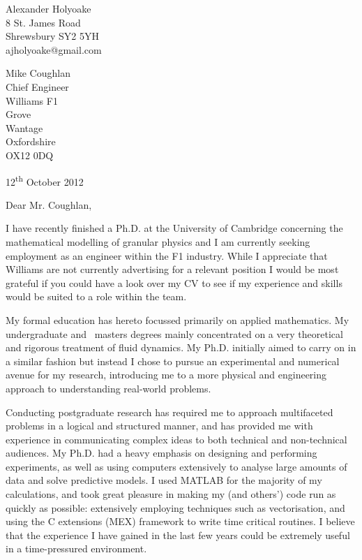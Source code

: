 \documentclass[a4paper,10pt]{article}
\begin{document}
\begin{flushright}
Alexander Holyoake \\ 8 St. James Road \\ Shrewsbury SY2 5YH \\ ajholyoake@gmail.com
\end{flushright}

\begin{flushleft} 
Mike Coughlan \\ Chief Engineer \\ Williams F1 \\ Grove \\ Wantage \\ Oxfordshire \\ OX12 0DQ
\end{flushleft}

\begin{flushright}
12\textsuperscript{th} October 2012
\end{flushright}


\noindent Dear Mr. Coughlan, 

I have recently finished a Ph.D. at the University of Cambridge concerning the mathematical modelling of granular physics and I am currently seeking employment as an engineer within the F1 industry. While I appreciate that Williams are not currently advertising for a relevant position I would be most grateful if you could have a look over my CV to see if my experience and skills would be suited to a role within the team. 

My formal education has hereto focussed primarily on applied mathematics. My undergraduate and  masters degrees mainly concentrated on a very theoretical and rigorous treatment of fluid dynamics. My Ph.D. initially aimed to carry on in a similar fashion but instead I chose to pursue an experimental and numerical avenue for my research, introducing me to a more physical and engineering approach to understanding real-world problems.

Conducting postgraduate research has required me to approach multifaceted problems in a logical and structured manner, and has provided me with experience in communicating complex ideas to both technical and non-technical audiences. My Ph.D. had a heavy emphasis on designing and performing experiments, as well as using computers extensively to analyse large amounts of data and solve predictive models. I used MATLAB for the majority of my calculations, and took great pleasure in making my (and others') code run as quickly as possible: extensively employing techniques such as vectorisation, and using the C extensions (MEX) framework to write time critical routines. I believe that the experience I have gained in the last few years could be extremely useful in a time-pressured environment. 
\end{document}
